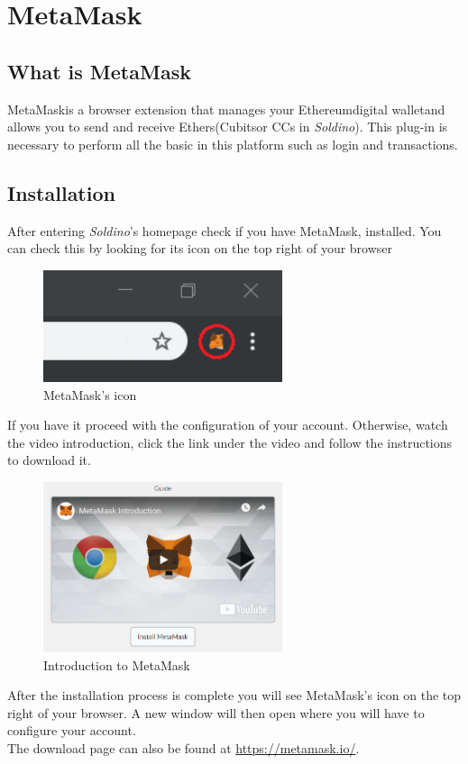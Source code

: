 \section{MetaMask}
	\subsection{What is MetaMask}
	MetaMask\glosp is a browser extension that manages your Ethereum\glosp digital wallet\glosp and 
	allows you to send and receive Ethers\glosp (Cubits\glosp or CCs in \textit{Soldino}). 
	This plug-in is necessary to perform all the basic in this platform
	such as login and transactions. 
	\subsection{Installation}
	After entering \textit{Soldino}'s homepage check if you have MetaMask\glosp, 
	installed. You can check this by looking for its icon on the top right of 
	your browser
	\begin{figure}[H]
		\includegraphics[width=7cm]{res/images/metamask_icon.png}
		\centering
		\caption{MetaMask's icon}
	\end{figure}
	\noindent If you have it proceed with the configuration of your account.
	Otherwise, watch the video introduction, click the link under the video and 
	follow the instructions to download it. 
	\begin{figure}[H]
		\includegraphics[width=7cm]{res/images/metamask_download.png}
		\centering
		\caption{Introduction to MetaMask}
	\end{figure}
	\noindent After the installation process is 
	complete you will see MetaMask\glo's icon on the top right of your browser. A 
	new window will then open where you will have to configure your account.\\
	The download page can also be found at \url{https://metamask.io/}.
